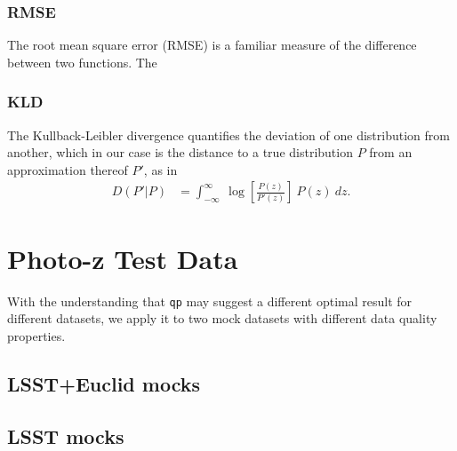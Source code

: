 \documentclass[\docopts]{\docclass}
\begin{document}
\subsubsection{RMSE}
\label{sec:rms}

The root mean square error (RMSE) is a familiar measure of the difference between two functions.  The

\subsubsection{KLD}
\label{sec:kld}

The Kullback-Leibler divergence quantifies the deviation of one distribution from another, which in our case is the distance to a true distribution $P$ from an approximation thereof $P'$, as in
\begin{align}
  D(P' | P) &= \int_{-\infty}^{\infty}\ \log\left[\frac{P(z)}{P'(z)}\right]\ P(z)\ dz.
\end{align}




\section{Photo-z Test Data}
\label{sec:data}

With the understanding that \texttt{qp} may suggest a different optimal result for different datasets, we apply it to two mock datasets with different data quality properties.


\subsection{LSST+Euclid mocks}
\label{sec:mg}

\subsection{LSST mocks}
\label{sec:ss}
\end{document}
